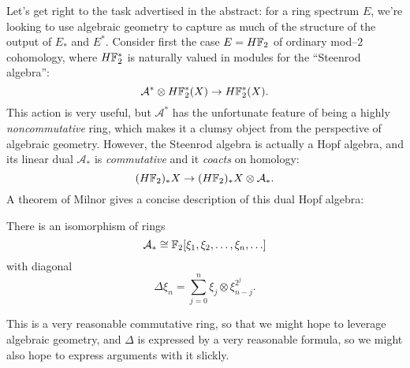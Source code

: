 Let's get right to the task advertised in the abstract: for a ring spectrum $E$, we're looking to use algebraic geometry to capture as much of the structure of the output of $E_*$ and $E^*$.  Consider first the case $E = H\mathbb F_2$ of ordinary mod--$2$ cohomology, where $H\mathbb F_2^*$ is naturally valued in modules for the ``Steenrod algebra'': \[\mathcal A^* \otimes H\mathbb F_2^*(X) \to H\mathbb F_2^*(X).\]  This action is very useful, but $\mathcal A^*$ has the unfortunate feature of being a highly \emph{noncommutative} ring, which makes it a clumsy object from the perspective of algebraic geometry.  However, the Steenrod algebra is actually a Hopf algebra, and its linear dual $\mathcal A_*$ is \emph{commutative} and it \emph{coacts} on homology: \[(H\mathbb F_2)_* X \to (H\mathbb F_2)_* X \otimes \mathcal A_*.\]  A theorem of Milnor gives a concise description of this dual Hopf algebra:
\begin{theorem}[Milnor]
There is an isomorphism of rings \[\mathcal A_* \cong \mathbb F_2[\xi_1, \xi_2, \ldots, \xi_n, \ldots]\] with diagonal \[\Delta \xi_n = \sum_{j=0}^n \xi_j \otimes \xi_{n-j}^{2^j}.\]
\end{theorem}
\noindent This is a very reasonable commutative ring, so that we might hope to leverage algebraic geometry, and $\Delta$ is expressed by a very reasonable formula, so we might also hope to express arguments with it slickly.

